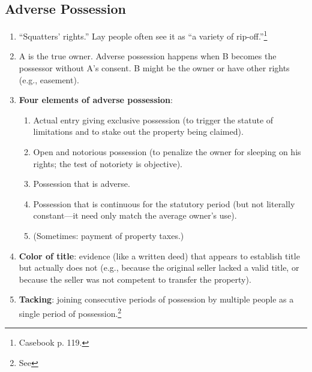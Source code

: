 % 

\subsection{Adverse Possession}

\begin{enumerate}
    \item ``Squatters' rights.'' Lay people often see it as ``a variety of 
    rip-off.''\footnote{Casebook p. 119.}
    \item A is the true owner. Adverse possession happens when B becomes the 
    possessor without A's consent. B might be the owner or have other rights 
    (e.g., easement).
    \item \textbf{Four elements of adverse possession}:
    \begin{enumerate}
        \item Actual entry giving exclusive possession (to trigger the statute 
        of limitations and to stake out the property being claimed).
        \item Open and notorious possession (to penalize the owner for 
        sleeping on his rights; the test of notoriety is objective).
        \item Possession that is adverse.
        \item Possession that is continuous for the statutory period (but not 
        literally constant---it need only match the average owner's use).
        \item (Sometimes: payment of property taxes.)
    \end{enumerate}
    \item \textbf{Color of title}: evidence (like a written deed) that appears 
    to establish title but actually does not (e.g., because the original 
    seller lacked a valid title, or because the seller was not competent to 
    transfer the property).
    \item \textbf{Tacking}: joining consecutive periods of possession by 
    multiple people as a single period of possession.\footnote{See 
}
\end{enumerate}

